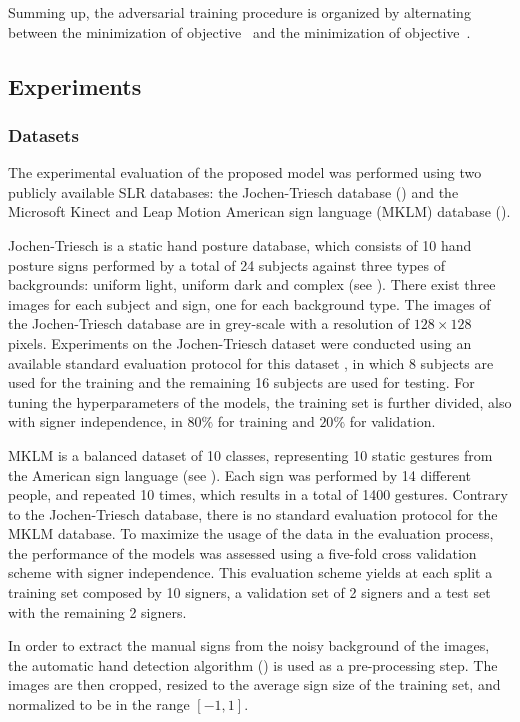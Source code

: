 Summing up, the adversarial training procedure is organized by alternating between the minimization of objective~ and the minimization of objective~.

\subsection{Experiments}
\label{sec:adv_signer_inv_experiments}

\subsubsection{Datasets}
The experimental evaluation of the proposed model was performed using two publicly available SLR databases: the Jochen-Triesch database (\citet{Triesch2001}) and the Microsoft Kinect and Leap Motion American sign language (MKLM) database (\citet{Marin2014, Marin2016}).

Jochen-Triesch is a static hand posture database, which consists of 10 hand posture signs performed by a total of 24 subjects against three types of backgrounds: uniform light, uniform dark and complex (see ). There exist three images for each subject and sign, one for each background type. The images of the Jochen-Triesch database are in grey-scale with a resolution of $128\times 128$ pixels. Experiments on the Jochen-Triesch dataset were conducted using an available standard evaluation protocol for this dataset \cite{Just_2006}, in which 8 subjects are used for the training and the remaining 16 subjects are used for testing. For tuning the hyperparameters of the models, the training set is further divided, also with signer independence, in $80\%$ for training and $20\%$ for validation.

MKLM is a balanced dataset of 10 classes, representing 10 static gestures from the American sign language (see ). Each sign was performed by 14 different people, and repeated 10 times, which results in a total of 1400 gestures. Contrary to the Jochen-Triesch database, there is no standard evaluation protocol for the MKLM database. To maximize the usage of the data in the evaluation process, the performance of the models was assessed using a five-fold cross validation scheme with signer independence. This evaluation scheme yields at each split a training set composed by 10 signers, a validation set of 2 signers and a test set with the remaining 2 signers.

In order to extract the manual signs from the noisy background of the images, the automatic hand detection algorithm (\citet{Ferreira2018}) is used as a pre-processing step. The images are then cropped, resized to the average sign size of the training set, and normalized to be in the range $[-1,1]$.

